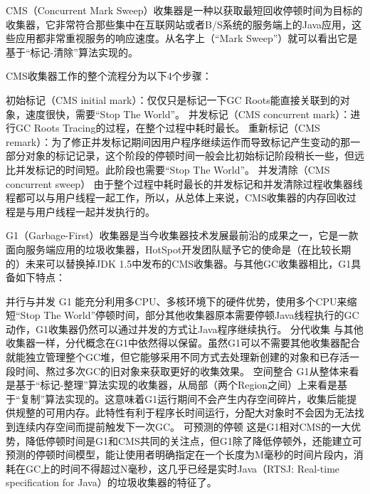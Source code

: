 \documentclass[../../../interview-questions.tex]{subfiles}
\begin{document}
CMS（Concurrent Mark Sweep）收集器是一种以获取最短回收停顿时间为目标的收集器，它非常符合那些集中在互联网站或者B/S系统的服务端上的Java应用，这些应用都非常重视服务的响应速度。从名字上（“Mark Sweep”）就可以看出它是基于“标记-清除”算法实现的。

CMS收集器工作的整个流程分为以下4个步骤：

初始标记（CMS initial mark）：仅仅只是标记一下GC Roots能直接关联到的对象，速度很快，需要“Stop The World”。
并发标记（CMS concurrent mark）：进行GC Roots Tracing的过程，在整个过程中耗时最长。
重新标记（CMS remark）：为了修正并发标记期间因用户程序继续运作而导致标记产生变动的那一部分对象的标记记录，这个阶段的停顿时间一般会比初始标记阶段稍长一些，但远比并发标记的时间短。此阶段也需要“Stop The World”。
并发清除（CMS concurrent sweep）
由于整个过程中耗时最长的并发标记和并发清除过程收集器线程都可以与用户线程一起工作，所以，从总体上来说，CMS收集器的内存回收过程是与用户线程一起并发执行的。


G1（Garbage-First）收集器是当今收集器技术发展最前沿的成果之一，它是一款面向服务端应用的垃圾收集器，HotSpot开发团队赋予它的使命是（在比较长期的）未来可以替换掉JDK 1.5中发布的CMS收集器。与其他GC收集器相比，G1具备如下特点：

并行与并发 G1 能充分利用多CPU、多核环境下的硬件优势，使用多个CPU来缩短“Stop The World”停顿时间，部分其他收集器原本需要停顿Java线程执行的GC动作，G1收集器仍然可以通过并发的方式让Java程序继续执行。
分代收集 与其他收集器一样，分代概念在G1中依然得以保留。虽然G1可以不需要其他收集器配合就能独立管理整个GC堆，但它能够采用不同方式去处理新创建的对象和已存活一段时间、熬过多次GC的旧对象来获取更好的收集效果。
空间整合 G1从整体来看是基于“标记-整理”算法实现的收集器，从局部（两个Region之间）上来看是基于“复制”算法实现的。这意味着G1运行期间不会产生内存空间碎片，收集后能提供规整的可用内存。此特性有利于程序长时间运行，分配大对象时不会因为无法找到连续内存空间而提前触发下一次GC。
可预测的停顿 这是G1相对CMS的一大优势，降低停顿时间是G1和CMS共同的关注点，但G1除了降低停顿外，还能建立可预测的停顿时间模型，能让使用者明确指定在一个长度为M毫秒的时间片段内，消耗在GC上的时间不得超过N毫秒，这几乎已经是实时Java（RTSJ: Real-time specification for Java）的垃圾收集器的特征了。
\end{document}
